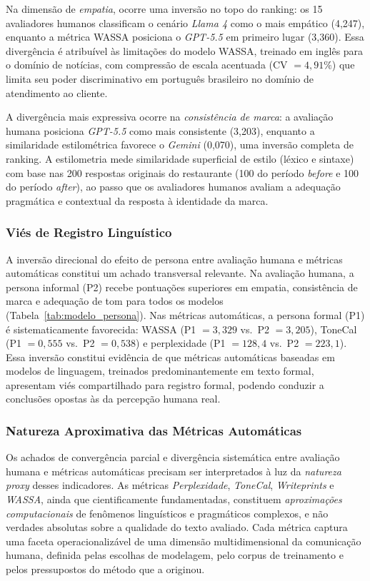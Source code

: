\documentclass[12pt, a4paper]{article}
\numberwithin{equation}{section}
\begin{document}
Na dimensão de \textit{empatia}, ocorre uma inversão no topo do ranking: os 15 avaliadores humanos classificam o cenário \textit{Llama 4} como o mais empático (4,247), enquanto a métrica WASSA posiciona o \textit{GPT-5.5} em primeiro lugar (3,360). Essa divergência é atribuível às limitações do modelo WASSA, treinado em inglês para o domínio de notícias, com compressão de escala acentuada (CV $= 4{,}91\%$) que limita seu poder discriminativo em português brasileiro no domínio de atendimento ao cliente.

A divergência mais expressiva ocorre na \textit{consistência de marca}: a avaliação humana posiciona \textit{GPT-5.5} como mais consistente (3,203), enquanto a similaridade estilométrica favorece o \textit{Gemini} (0,070), uma inversão completa de ranking. A estilometria mede similaridade superficial de estilo (léxico e sintaxe) com base nas 200 respostas originais do restaurante (100 do período \textit{before} e 100 do período \textit{after}), ao passo que os avaliadores humanos avaliam a adequação pragmática e contextual da resposta à identidade da marca.

\subsubsection{Viés de Registro Linguístico}

A inversão direcional do efeito de persona entre avaliação humana e métricas automáticas constitui um achado transversal relevante. Na avaliação humana, a persona informal (P2) recebe pontuações superiores em empatia, consistência de marca e adequação de tom para todos os modelos (Tabela~\ref{tab:modelo_persona}). Nas métricas automáticas, a persona formal (P1) é sistematicamente favorecida: WASSA (P1 $= 3{,}329$ vs.\ P2 $= 3{,}205$), ToneCal (P1 $= 0{,}555$ vs.\ P2 $= 0{,}538$) e perplexidade (P1 $= 128{,}4$ vs.\ P2 $= 223{,}1$). Essa inversão constitui evidência de que métricas automáticas baseadas em modelos de linguagem, treinados predominantemente em texto formal, apresentam viés compartilhado para registro formal, podendo conduzir a conclusões opostas às da percepção humana real.

\subsubsection{Natureza Aproximativa das Métricas Automáticas} 
Os achados de convergência parcial e divergência sistemática entre avaliação humana e métricas automáticas precisam ser interpretados à luz da \textit{natureza proxy} desses indicadores. As métricas \textit{Perplexidade}, \textit{ToneCal}, \textit{Writeprints} e \textit{WASSA}, ainda que cientificamente fundamentadas, constituem \textit{aproximações computacionais} de fenômenos linguísticos e pragmáticos complexos, e não verdades absolutas sobre a qualidade do texto avaliado. Cada métrica captura uma faceta operacionalizável de uma dimensão multidimensional da comunicação humana, definida pelas escolhas de modelagem, pelo corpus de treinamento e pelos pressupostos do método que a originou.
\end{document}
